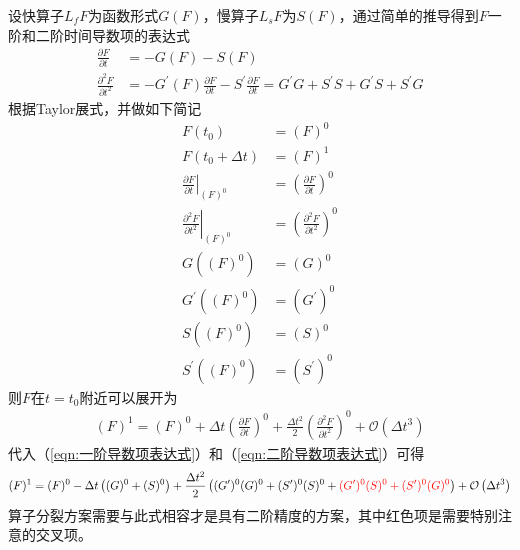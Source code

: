 \documentclass{ctexart}
\begin{document}
设快算子$L_f F$为函数形式$G(F)$，慢算子$L_s F$为$S(F)$，通过简单的推导得到$F$一阶和二阶时间导数项的表达式
\begin{align}
  \frac{\partial F}{\partial t} & = - G(F) - S(F) \label{eqn:一阶导数项表达式} \\
  \frac{\partial^2 F}{\partial t^2} & = - G^\prime(F) \frac{\partial F}{\partial t} - S^\prime \frac{\partial F}{\partial t} = G^\prime G + S^\prime S + G^\prime S + S^\prime G \label{eqn:二阶导数项表达式}
\end{align}
根据Taylor展式，并做如下简记
\begin{align*}
  F(t_0) & = (F)^0 \\
  F(t_0 + \Delta{t}) & = (F)^1 \\
  \left. \frac{\partial F}{\partial t} \right|_{(F)^0} & = \left( \frac{\partial F}{\partial t} \right)^0 \\
  \left. \frac{\partial^2 F}{\partial t^2} \right|_{(F)^0} & = \left( \frac{\partial^2 F}{\partial t^2} \right)^0 \\
  G((F)^0) & = (G)^0 \\
  G^\prime((F)^0) & = (G^\prime)^0 \\
  S((F)^0) & = (S)^0 \\
  S^\prime((F)^0) & = (S^\prime)^0
\end{align*}
则$F$在$t = t_0$附近可以展开为
\begin{align}
  (F)^1 = (F)^0 + \Delta{t} \left( \frac{\partial F}{\partial t} \right)^0 + \frac{\Delta{t}^2}{2} \left( \frac{\partial^2 F}{\partial t^2} \right)^0 + \mathcal{O} \left( \Delta{t}^3 \right)
\end{align}
代入（\ref{eqn:一阶导数项表达式}）和（\ref{eqn:二阶导数项表达式}）可得
\begin{align}
  (F)^1 = (F)^0 - \Delta{t} \left( (G)^0 + (S)^0 \right) + \frac{\Delta{t}^2}{2} \left( (G^\prime)^0 (G)^0 + (S^\prime)^0 (S)^0 + {\color{red} (G^\prime)^0 (S)^0 + (S^\prime)^0 (G)^0} \right) + \mathcal{O} \left( \Delta{t}^3 \right) \label{eqn:算子分裂等式}
\end{align}
算子分裂方案需要与此式相容才是具有二阶精度的方案，其中红色项是需要特别注意的交叉项。
\end{document}
